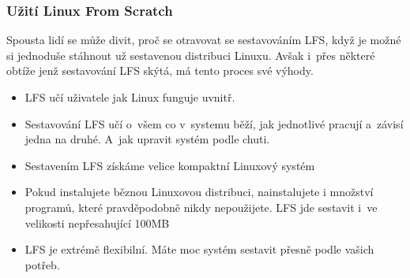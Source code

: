 \documentclass[a4paper,12pt]{article}
\begin{document}
\subsubsection{Užití Linux From Scratch}
Spousta lidí se může divit, proč se otravovat se sestavováním LFS, když je možné si jednoduše stáhnout už sestavenou distribuci Linuxu. Avšak i~přes některé obtíže jenž sestavování LFS skýtá, má tento proces své výhody.~\cite{LFS}

\begin{itemize}
 \item LFS učí uživatele jak Linux funguje uvnitř.
 \item Sestavování LFS učí o~všem co v~systemu běží, jak jednotlivé pracují a~závisí jedna na druhé. A~jak upravit systém podle chuti.
 \item Sestavením LFS získáme velice kompaktní Linuxový systém
 \item Pokud instalujete běznou Linuxovou distribuci, nainstalujete i množství programů, které pravděpodobně nikdy nepoužijete. LFS jde sestavit i~ve velikosti nepřesahující 100MB
\item LFS je extrémě flexibilní. Máte moc systém sestavit přesně podle vašich potřeb.

\end{itemize}
\end{document}
